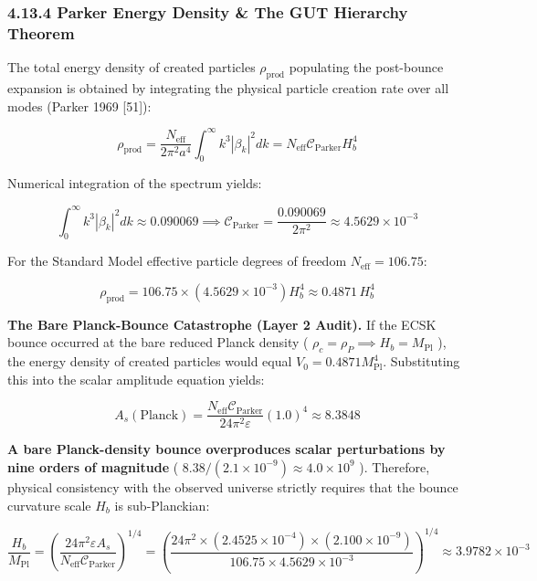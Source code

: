 \documentclass[11pt,a4paper]{article}
\theoremstyle{definition}\newtheorem{definition}{Definition}
\theoremstyle{remark}\newtheorem{remark}{Remark}
\begin{document}
\subsubsection{4.13.4 Parker Energy Density \& The GUT Hierarchy Theorem}

The total energy density of created particles $\rho_{\text{prod}}$ populating the post-bounce expansion is obtained by integrating the physical particle creation rate over all modes (Parker 1969 [51]):


\begin{equation}
\rho_{\text{prod}} = \frac{N_{\text{eff}}}{2\pi^2 a^4} \int_0^\infty k^3 |\beta_k|^2 dk = N_{\text{eff}} \mathcal{C}_{\text{Parker}} H_b^4
\end{equation}


Numerical integration of the spectrum yields:


\begin{equation}
\int_0^\infty k^3 |\beta_k|^2 dk \approx 0.090069 \implies \mathcal{C}_{\text{Parker}} = \frac{0.090069}{2\pi^2} \approx 4.5629 \times 10^{-3}
\end{equation}


For the Standard Model effective particle degrees of freedom $N_{\text{eff}} = 106.75$:


\begin{equation}
\rho_{\text{prod}} = 106.75 \times (4.5629 \times 10^{-3}) H_b^4 \approx 0.4871 \, H_b^4
\end{equation}


\textbf{The Bare Planck-Bounce Catastrophe (Layer 2 Audit).} If the ECSK bounce occurred at the bare reduced Planck density ( $\rho_c = \rho_P \implies H_b = M_{\text{Pl}}$ ), the energy density of created particles would equal $V_0 = 0.4871 M_{\text{Pl}}^4$. Substituting this into the scalar amplitude equation yields:


\begin{equation}
A_s(\text{Planck}) = \frac{N_{\text{eff}} \mathcal{C}_{\text{Parker}}}{24\pi^2 \varepsilon} (1.0)^4 \approx 8.3848
\end{equation}


\textbf{A bare Planck-density bounce overproduces scalar perturbations by nine orders of magnitude} ( $8.38 / (2.1 \times 10^{-9}) \approx 4.0 \times 10^9$ ). Therefore, physical consistency with the observed universe strictly requires that the bounce curvature scale $H_b$ is sub-Planckian:


\begin{equation}
\frac{H_b}{M_{\text{Pl}}} = \left( \frac{24\pi^2 \varepsilon A_s}{N_{\text{eff}} \mathcal{C}_{\text{Parker}}} \right)^{1/4} = \left( \frac{24\pi^2 \times (2.4525 \times 10^{-4}) \times (2.100 \times 10^{-9})}{106.75 \times 4.5629 \times 10^{-3}} \right)^{1/4} \approx 3.9782 \times 10^{-3}
\end{equation}
\end{document}
